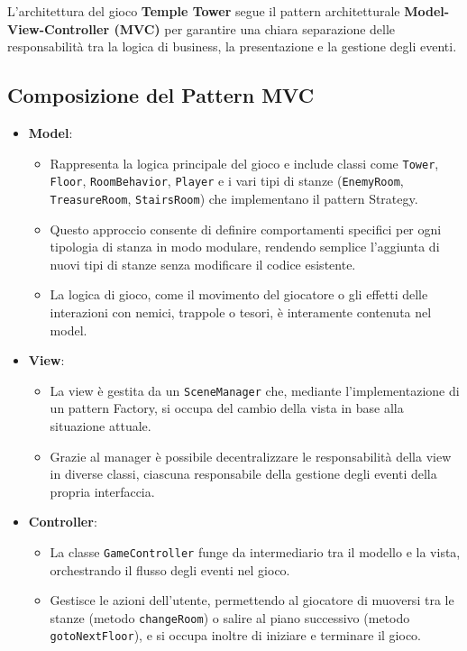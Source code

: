 \documentclass[a4paper,12pt]{report}
\begin{document}
L'architettura del gioco \textbf{Temple Tower} segue il pattern architetturale \textbf{Model-View-Controller (MVC)} per garantire una chiara separazione delle responsabilità tra la logica di business, la presentazione e la gestione degli eventi.

\subsection*{Composizione del Pattern MVC}
\begin{itemize}
    \item \textbf{Model}: 
    \begin{itemize}
        \item Rappresenta la logica principale del gioco e include classi come \texttt{Tower}, \texttt{Floor}, \texttt{RoomBehavior}, \texttt{Player} e i vari tipi di stanze (\texttt{EnemyRoom}, \texttt{TreasureRoom}, \texttt{StairsRoom}) che implementano il pattern Strategy.
        \item Questo approccio consente di definire comportamenti specifici per ogni tipologia di stanza in modo modulare, rendendo semplice l'aggiunta di nuovi tipi di stanze senza modificare il codice esistente.
        \item La logica di gioco, come il movimento del giocatore o gli effetti delle interazioni con nemici, trappole o tesori, è interamente contenuta nel model.
    \end{itemize}

    \item \textbf{View}: 
    \begin{itemize}
        \item La view è gestita da un \texttt{SceneManager} che, mediante l'implementazione di un pattern Factory, si occupa del cambio della vista in base alla situazione attuale.
        \item Grazie al manager è possibile decentralizzare le responsabilità della view in diverse classi, ciascuna responsabile della gestione degli eventi della propria interfaccia.
    \end{itemize}

    \item \textbf{Controller}: 
    \begin{itemize}
        \item La classe \texttt{GameController} funge da intermediario tra il modello e la vista, orchestrando il flusso degli eventi nel gioco.
        \item Gestisce le azioni dell'utente, permettendo al giocatore di muoversi tra le stanze (metodo \texttt{changeRoom}) o salire al piano successivo (metodo \texttt{gotoNextFloor}), e si occupa inoltre di iniziare e terminare il gioco.
    \end{itemize}
\end{itemize} 
\end{document}
